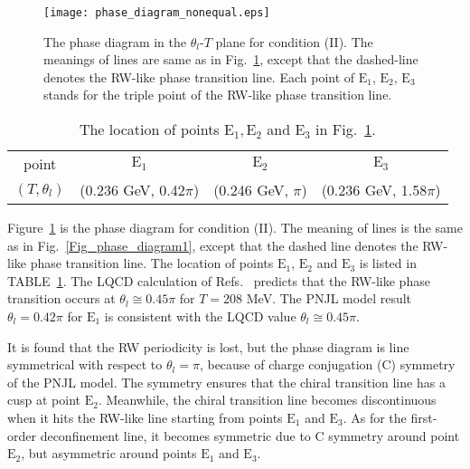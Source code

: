 \documentclass[prd,superscriptaddress,unsortedaddress,
twocolumn,showpacs,preprintnumbers,amsmath,amssymb]{revtex4}
\begin{document}
      \begin{figure}[t]
   \begin{center}
    \texttt{[image: phase\_diagram\_nonequal.eps]}
   \end{center}
      \caption{
     The phase diagram in the $\theta_{l}$-$T$ plane
     for condition (II).
     The meanings of lines are same as in Fig.~\ref{Fig_phase_diagram2},
       except that the dashed-line denotes the RW-like phase transition line.
       Each point of $\textrm{E}_{1}$,
       $\textrm{E}_{2}$, $\textrm{E}_{3}$ stands for the triple point of the RW-like phase
       transition line.
      }
      \label{Fig_phase_diagram2}
      \end{figure}

       \begin{table}[b]
        \begin{center}
         \caption{
         The location of points $\textrm{E}_{1}, \textrm{E}_{2}$ and $\textrm{E}_{3}$
         in Fig.~\ref{Fig_phase_diagram2}.
         }
         \begin{tabular}{c|ccc}
          \hline \hline
          point & $\textrm{E}_{1}$ & $\textrm{E}_{2}$ & $\textrm{E}_{3}$ \\
          $(T,\theta_{l})$ & (0.236 GeV, 0.42$\pi$) & (0.246 GeV, $\pi$) &
                      (0.236 GeV, 1.58$\pi$)
                  \\ \hline \hline
         \end{tabular}
         \label{table2}
        \end{center}
       \end{table}

  Figure~\ref{Fig_phase_diagram2} is the
  phase diagram for condition (II).
  The meaning of lines is the same as in Fig.~\ref{Fig_phase_diagram1},
  except that the dashed line denotes the RW-like phase transition line.
  The location of points $\textrm{E}_{1}$, $\textrm{E}_{2}$
  and $\textrm{E}_{3}$ is listed in TABLE~\ref{table2}.
  The LQCD calculation of Refs.~\cite{Bonati} predicts that
  the RW-like phase transition occurs
  at $\theta_{l}\cong 0.45\pi$ for $T=208$ MeV.
  The PNJL model result $\theta_{l}=0.42\pi$
  for $\textrm{E}_{1}$ is consistent with the LQCD value
  $\theta_{l}\cong 0.45\pi$.
  
  It is found that the RW periodicity is lost, but
  the phase diagram is line symmetrical with respect to $\theta_{l}=\pi$,
  because of charge conjugation (C) symmetry of the PNJL model.
  The symmetry ensures that
  the chiral transition line has a cusp at point $\textrm{E}_{2}$.
  Meanwhile, the chiral transition line becomes discontinuous
  when it hits the RW-like line starting from points $\textrm{E}_{1}$
  and $\textrm{E}_{3}$.
  As for the first-order deconfinement line,
  it becomes symmetric due to C symmetry around point $\textrm{E}_{2}$,
  but asymmetric around points $\textrm{E}_{1}$ and $\textrm{E}_{3}$.
\end{document}
